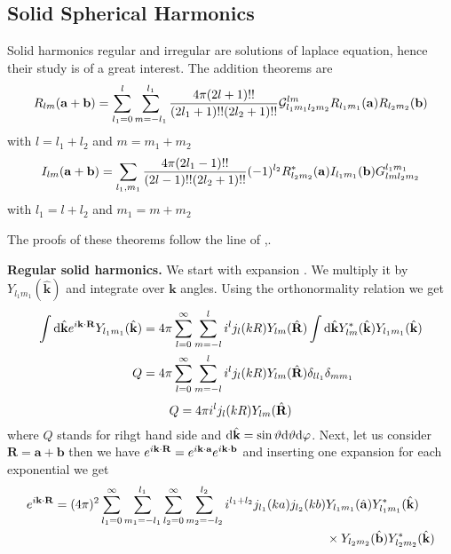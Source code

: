 \subsection{Solid Spherical Harmonics}
\par{Solid harmonics regular and irregular are solutions of laplace equation,
  hence their study is of a great interest. The addition theorems are}
\begin{equation}
R_{lm}({\bf a}+{\bf b})=\sum_{l_1=0}^{l}\sum_{m=-l_1}^{l_1}\frac{4\pi(2l+1)!!}{(2l_1+1)!!(2l_2+1)!!}\mathcal{G}_{l_1m_1l_2m_2}^{lm}R_{l_1m_1}({\bf a})R_{l_2m_2}({\bf b})
\end{equation}
with $l=l_1+l_2$ and $m=m_1+m_2$
\begin{equation}
I_{lm}({\bf a}+{\bf b})=\sum_{l_1,m_1}\frac{4\pi(2l_1-1)!!}{(2l-1)!!(2l_2+1)!!}(-1)^{l_2}R_{l_2m_2}^{*}({\bf a})I_{l_1m_1}({{\bf b}})G_{lml_2m_2}^{l_1m_1}
\end{equation}
with $l_1=l+l_2$ and $m_1=m+m_2$
\par{The proofs of these theorems follow the line of \citep{Chakrabarti95},\citep{Deb83}.}
\par{\textbf{Regular solid harmonics. }
We start with expansion . We multiply it by $Y_{l_1m_1}(\hat{\bm{k}})$
and integrate over $\bm{k}$ angles. Using the orthonormality relation we get}
\begin{equation}
\begin{split}
\int \text{d} {\hat{{\bf k}}}e^{i{\bf k}\cdot {\bf R}}Y_{l_1m_1}(\hat{{\bf k}})&=4\pi
\sum_{l=0}^{\infty}\sum_{m=-l}^{l}i^lj_l(kR)Y_{lm}(\hat{\bf R})\int \text{d}
{\hat{{\bf k}}} Y_{lm}^{*}(\hat{\bf k})Y_{l_1m_1}(\hat{{\bf k}})\\
Q&=4\pi
\sum_{l=0}^{\infty}\sum_{m=-l}^{l}i^lj_l(kR)Y_{lm}(\hat{\bf R})\delta_{ll_1}\delta_{mm_1}
\end{split}
\end{equation}
\begin{equation}
\label{p1}
Q=4\pi i^lj_l(kR)Y_{lm}(\hat{\bf R})
\end{equation} 
where $Q$ stands for rihgt hand side and $\text{d} {\hat{{\bf k}}}=\sin \vartheta
\text{d} \vartheta \text{d} \varphi$. Next, let us consider
$\bm{R}=\bm{a}+\bm{b}$ then we have $e^{i{\bf k}\cdot {\bf R}}=e^{i{\bf
    k}\cdot {\bf a}}e^{i{\bf k}\cdot {\bf b}}$ and inserting one expansion
 for each exponential we get
\begin{equation}
\begin{split}
e^{i{\bf k}\cdot {\bf R}}=(4\pi)^2
\sum_{l_1=0}^{\infty}\sum_{m_1=-l_1}^{l_1}\sum_{l_2=0}^{\infty}\sum_{m_2=-l_2}^{l_2}i^{l_1+l_2}j_{l_1}(ka)j_{l_2}(kb)&Y_{l_1m_1}(\hat{\bf a})Y_{l_1m_1}^{*}(\hat{\bf k})\\&\times Y_{l_2m_2}(\hat{\bf b})Y_{l_2m_2}^{*}(\hat{\bf k})
\end{split}
\end{equation}
